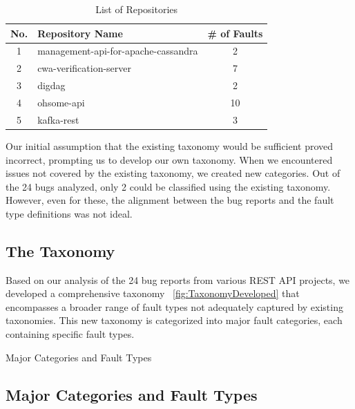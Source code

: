 \documentclass[conference]{IEEEtran}
\begin{document}
\begin{table}
    \centering
    \caption{List of Repositories}
    \label{tab:repositories}
    \begin{tabular}{|c|l|c|}
    \hline
        \hline
        \textbf{No.} & \textbf{Repository Name} & \textbf{\# of Faults} \\ \hline
        1 & management-api-for-apache-cassandra & 2 \\ \hline
        2 & cwa-verification-server &  7 \\ \hline
        3 & digdag & 2 \\ \hline
        4 & ohsome-api & 10 \\ \hline
        5 & kafka-rest & 3 \\ \hline
    \end{tabular}
\end{table}
    

Our initial assumption that the existing taxonomy would be sufficient proved incorrect, prompting us to develop our own taxonomy. 
When we encountered issues not covered by the existing taxonomy, we created new categories. Out of the 24 bugs analyzed, only 2 could be classified using the existing taxonomy. 
However, even for these, the alignment between the bug reports and the fault type definitions was not ideal.

\subsection{The Taxonomy}
\label{sec:newtaxonomy}

Based on our analysis of the 24 bug reports from various REST API projects, we developed a comprehensive taxonomy ~\ref{fig:TaxonomyDeveloped} that encompasses a broader range of fault types not adequately captured by existing taxonomies. This new taxonomy is categorized into major fault categories, each containing specific fault types.

Major Categories and Fault Types

\subsection{Major Categories and Fault Types}
\end{document}

